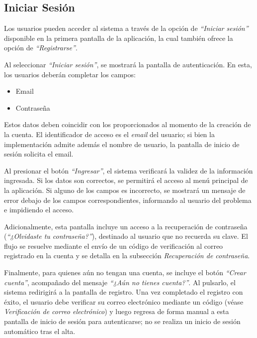 \documentclass[a4paper,12pt]{article}
\begin{document}
    \subsection{Iniciar Sesión}
    \par Los usuarios pueden acceder al sistema a través de la opción de \textit{``Iniciar sesión''} disponible en la primera pantalla de la aplicación, la cual también ofrece la opción de \textit{``Registrarse''}.
    \par Al seleccionar \textit{``Iniciar sesión''}, se mostrará la pantalla de autenticación. En esta, los usuarios deberán completar los campos:
    \begin{itemize}
        \item Email
        \item Contraseña
    \end{itemize}
    \par Estos datos deben coincidir con los proporcionados al momento de la creación de la cuenta. El identificador de acceso es el \textit{email} del usuario; si bien la implementación admite además el nombre de usuario, la pantalla de inicio de sesión solicita el email.
    \par Al presionar el botón \textit{``Ingresar''}, el sistema verificará la validez de la información ingresada. Si los datos son correctos, se permitirá el acceso al menú principal de la aplicación. Si alguno de los campos es incorrecto, se mostrará un mensaje de error debajo de los campos correspondientes, informando al usuario del problema e impidiendo el acceso.
    \par Adicionalmente, esta pantalla incluye un acceso a la recuperación de contraseña (\textit{``¿Olvidaste tu contraseña?''}), destinado al usuario que no recuerda su clave. El flujo se resuelve mediante el envío de un código de verificación al correo registrado en la cuenta y se detalla en la subsección \textit{Recuperación de contraseña}.
    \par Finalmente, para quienes aún no tengan una cuenta, se incluye el botón \textit{``Crear cuenta''}, acompañado del mensaje \textit{``¿Aún no tienes cuenta?''}. Al pulsarlo, el sistema redirigirá a la pantalla de registro. Una vez completado el registro con éxito, el usuario debe verificar su correo electrónico mediante un código (véase \textit{Verificación de correo electrónico}) y luego regresa de forma manual a esta pantalla de inicio de sesión para autenticarse; no se realiza un inicio de sesión automático tras el alta.
\end{document}
